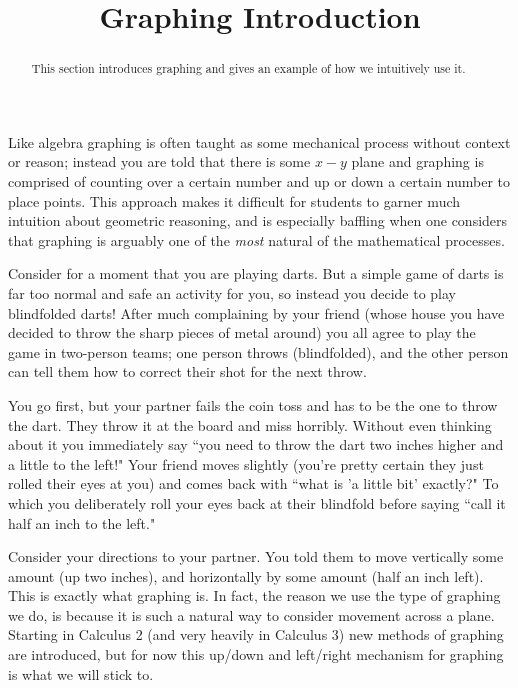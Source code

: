 \documentclass{ximera}
\title{Graphing Introduction}
\begin{document}
\begin{abstract}
    This section introduces graphing and gives an example of how we intuitively use it.
\end{abstract}
\maketitle

Like algebra graphing is often taught as some mechanical process without context or reason; instead you are told that there is some $x-y$ plane and graphing is comprised of counting over a certain number and up or down a certain number to place points. This approach makes it difficult for students to garner much intuition about geometric reasoning, and is especially baffling when one considers that graphing is arguably one of the \textit{most} natural of the mathematical processes.

\begin{example}
    Consider for a moment that you are playing darts. But a simple game of darts is far too normal and safe an activity for you, so instead you decide to play blindfolded darts! After much complaining by your friend (whose house you have decided to throw the sharp pieces of metal around) you all agree to play the game in two-person teams; one person throws (blindfolded), and the other person can tell them how to correct their shot for the next throw.
    
    You go first, but your partner fails the coin toss and has to be the one to throw the dart. They throw it at the board and miss horribly. Without even thinking about it you immediately say ``you need to throw the dart two inches higher and a little to the left!" Your friend moves slightly (you're pretty certain they just rolled their eyes at you) and comes back with ``what is 'a little bit' exactly?" To which you deliberately roll your eyes back at their blindfold before saying ``call it half an inch to the left."
\end{example}

\begin{explanation}
    Consider your directions to your partner. You told them to move vertically some amount (up two inches), and horizontally by some amount (half an inch left). This is exactly what graphing is. In fact, the reason we use the type of graphing we do, is because it is such a natural way to consider movement across a plane. Starting in Calculus 2 (and very heavily in Calculus 3) new methods of graphing are introduced, but for now this up/down and left/right mechanism for graphing is what we will stick to.
\end{explanation}
\end{document}
